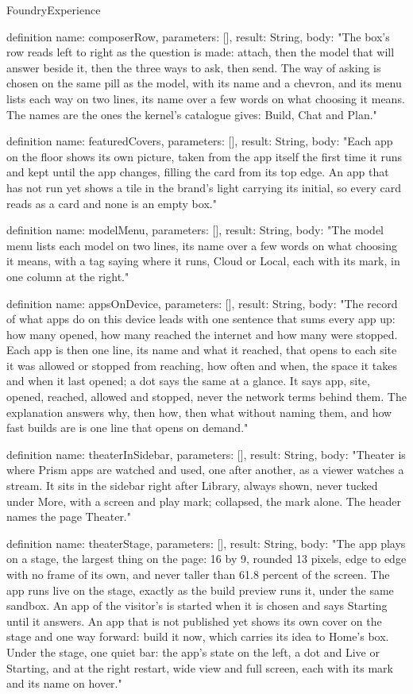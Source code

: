\begin{lexlean}{FoundryExperience}
\begin{semanticmodule}
definition{
  name: composerRow,
  parameters: [],
  result: String,
  body: "The box's row reads left to right as the question is made: attach, then the model that will answer beside it, then the three ways to ask, then send. The way of asking is chosen on the same pill as the model, with its name and a chevron, and its menu lists each way on two lines, its name over a few words on what choosing it means. The names are the ones the kernel's catalogue gives: Build, Chat and Plan."
}

definition{
  name: featuredCovers,
  parameters: [],
  result: String,
  body: "Each app on the floor shows its own picture, taken from the app itself the first time it runs and kept until the app changes, filling the card from its top edge. An app that has not run yet shows a tile in the brand's light carrying its initial, so every card reads as a card and none is an empty box."
}

definition{
  name: modelMenu,
  parameters: [],
  result: String,
  body: "The model menu lists each model on two lines, its name over a few words on what choosing it means, with a tag saying where it runs, Cloud or Local, each with its mark, in one column at the right."
}

definition{
  name: appsOnDevice,
  parameters: [],
  result: String,
  body: "The record of what apps do on this device leads with one sentence that sums every app up: how many opened, how many reached the internet and how many were stopped. Each app is then one line, its name and what it reached, that opens to each site it was allowed or stopped from reaching, how often and when, the space it takes and when it last opened; a dot says the same at a glance. It says app, site, opened, reached, allowed and stopped, never the network terms behind them. The explanation answers why, then how, then what without naming them, and how fast builds are is one line that opens on demand."
}

definition{
  name: theaterInSidebar,
  parameters: [],
  result: String,
  body: "Theater is where Prism apps are watched and used, one after another, as a viewer watches a stream. It sits in the sidebar right after Library, always shown, never tucked under More, with a screen and play mark; collapsed, the mark alone. The header names the page Theater."
}

definition{
  name: theaterStage,
  parameters: [],
  result: String,
  body: "The app plays on a stage, the largest thing on the page: 16 by 9, rounded 13 pixels, edge to edge with no frame of its own, and never taller than 61.8 percent of the screen. The app runs live on the stage, exactly as the build preview runs it, under the same sandbox. An app of the visitor's is started when it is chosen and says Starting until it answers. An app that is not published yet shows its own cover on the stage and one way forward: build it now, which carries its idea to Home's box. Under the stage, one quiet bar: the app's state on the left, a dot and Live or Starting, and at the right restart, wide view and full screen, each with its mark and its name on hover."
}


\end{semanticmodule}
\end{lexlean}
